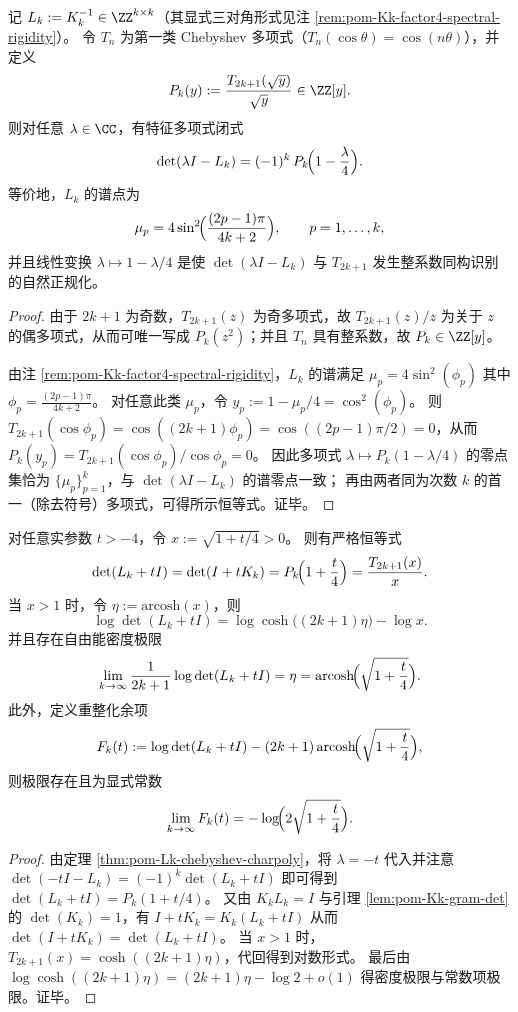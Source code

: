 \begin{theorem}\label{thm:pom-Lk-chebyshev-charpoly}
记 \(L_k:=K_k^{-1}\in\ZZ^{k\times k}\)（其显式三对角形式见注 \ref{rem:pom-Kk-factor4-spectral-rigidity}）。
令 \(T_n\) 为第一类 Chebyshev 多项式（\(T_n(\cos\theta)=\cos(n\theta)\)），并定义
\[
P_k(y):=\frac{T_{2k+1}(\sqrt y)}{\sqrt y}\in\ZZ[y].
\]
则对任意 \(\lambda\in\CC\)，有特征多项式闭式
\[
\det(\lambda I-L_k)=(-1)^k\,P_k\!\Bigl(1-\frac{\lambda}{4}\Bigr).
\]
等价地，\(L_k\) 的谱点为
\[
\mu_p=4\sin^2\!\Bigl(\frac{(2p-1)\pi}{4k+2}\Bigr),\qquad p=1,\dots,k,
\]
并且线性变换 \(\lambda\mapsto 1-\lambda/4\) 是使 \(\det(\lambda I-L_k)\) 与 \(T_{2k+1}\) 发生整系数同构识别的自然正规化。
\end{theorem}
\begin{proof}
由于 \(2k+1\) 为奇数，\(T_{2k+1}(z)\) 为奇多项式，故 \(T_{2k+1}(z)/z\) 为关于 \(z\) 的偶多项式，从而可唯一写成 \(P_k(z^2)\)；并且 \(T_n\) 具有整系数，故 \(P_k\in\ZZ[y]\)。
\par
由注 \ref{rem:pom-Kk-factor4-spectral-rigidity}，\(L_k\) 的谱满足
\(
\mu_p=4\sin^2(\phi_p)
\)
其中 \(\phi_p=\frac{(2p-1)\pi}{4k+2}\)。
对任意此类 \(\mu_p\)，令 \(y_p:=1-\mu_p/4=\cos^2(\phi_p)\)。
则 \(T_{2k+1}(\cos\phi_p)=\cos((2k+1)\phi_p)=\cos((2p-1)\pi/2)=0\)，从而
\(
P_k(y_p)=T_{2k+1}(\cos\phi_p)/\cos\phi_p=0
\)。
因此多项式 \(\lambda\mapsto P_k(1-\lambda/4)\) 的零点集恰为 \(\{\mu_p\}_{p=1}^k\)，与 \(\det(\lambda I-L_k)\) 的谱零点一致；
再由两者同为次数 \(k\) 的首一（除去符号）多项式，可得所示恒等式。证毕。
\end{proof}

\begin{corollary}\label{cor:pom-Lk-shifted-det-free-energy}
对任意实参数 \(t>-4\)，令 \(x:=\sqrt{1+t/4}>0\)。
则有严格恒等式
\[
\det(L_k+tI)=\det(I+tK_k)=P_k\!\Bigl(1+\frac{t}{4}\Bigr)=\frac{T_{2k+1}(x)}{x}.
\]
当 \(x>1\) 时，令 \(\eta:=\mathrm{arcosh}(x)\)，则
\[
\log\det(L_k+tI)=\log\cosh\bigl((2k+1)\eta\bigr)-\log x.
\]
并且存在自由能密度极限
\[
\lim_{k\to\infty}\frac{1}{2k+1}\log\det(L_k+tI)=\eta=\mathrm{arcosh}\!\Bigl(\sqrt{1+\frac{t}{4}}\Bigr).
\]
此外，定义重整化余项
\[
F_k(t):=\log\det(L_k+tI)-(2k+1)\,\mathrm{arcosh}\!\Bigl(\sqrt{1+\frac{t}{4}}\Bigr),
\]
则极限存在且为显式常数
\[
\lim_{k\to\infty}F_k(t)=-\log\!\Bigl(2\sqrt{1+\frac{t}{4}}\Bigr).
\]
\end{corollary}
\begin{proof}
由定理 \ref{thm:pom-Lk-chebyshev-charpoly}，将 \(\lambda=-t\) 代入并注意
\(
\det(-tI-L_k)=(-1)^k\det(L_k+tI)
\)
即可得到 \(\det(L_k+tI)=P_k(1+t/4)\)。
又由 \(K_kL_k=I\) 与引理 \ref{lem:pom-Kk-gram-det} 的 \(\det(K_k)=1\)，有
\(
I+tK_k=K_k(L_k+tI)
\)
从而 \(\det(I+tK_k)=\det(L_k+tI)\)。
当 \(x>1\) 时，\(T_{2k+1}(x)=\cosh((2k+1)\eta)\)，代回得到对数形式。
最后由 \(\log\cosh((2k+1)\eta)=(2k+1)\eta-\log 2+o(1)\) 得密度极限与常数项极限。证毕。
\end{proof}


